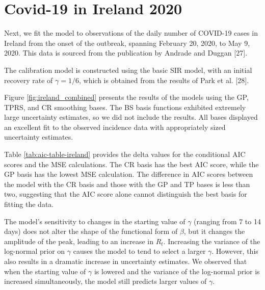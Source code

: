 \documentclass[
11pt, %
oneside, %
english, %
singlespacing, %
]{macthesis} %
\begin{document}
\section{Covid-19 in Ireland 2020}\label{Ireland}

Next, we fit the model to observations of the daily number of COVID-19 cases in Ireland from the onset of the outbreak, spanning February 20, 2020, to May 9, 2020. This data is sourced from the publication by Andrade and Duggan {[}27{]}.

The calibration model is constructed using the basic SIR model, with an initial recovery rate of \(\gamma = 1/6\), which is obtained from the results of Park et al. {[}28{]}.

Figure \ref{fig:ireland_combined} presents the results of the models using the GP, TPRS, and CR smoothing bases. The BS basis functions exhibited extremely large uncertainty estimates, so we did not include the results. All bases displayed an excellent fit to the observed incidence data with appropriately sized uncertainty estimates.

Table \ref{tab:aic-table-ireland} provides the delta values for the conditional AIC scores and the MSE calculations. The CR basis has the best AIC score, while the GP basis has the lowest MSE calculation. The difference in AIC scores between the model with the CR basis and those with the GP and TP bases is less than two, suggesting that the AIC score alone cannot distinguish the best basis for fitting the data.

The model's sensitivity to changes in the starting value of \(\gamma\) (ranging from 7 to 14 days) does not alter the shape of the functional form of \(\beta\), but it changes the amplitude of the peak, leading to an increase in \(R_t\). Increasing the variance of the log-normal prior on \(\gamma\) causes the model to tend to select a larger \(\gamma\). However, this also results in a dramatic increase in uncertainty estimates. We observed that when the starting value of \(\gamma\) is lowered and the variance of the log-normal prior is increased simultaneously, the model still predicts larger values of \(\gamma\).
\end{document}
